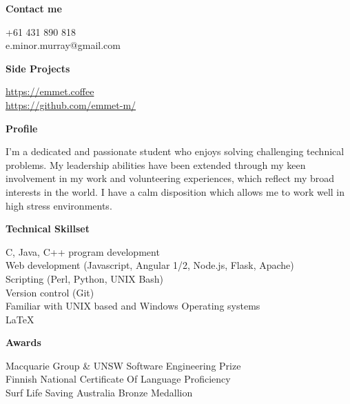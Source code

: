 \documentclass{article}
\newcommand{\mytitle}[1]{{\Large \textbf{#1}} \vspace{0.2cm}}
\begin{document}
\begin{minipage}[t]{0.3\linewidth}
    \vspace{0.2cm}
    {
        \mytitle{Contact me}
        
        +61 431 890 818 \\
        e.minor.murray@gmail.com \\

    }
    \vspace{0.2cm}
    {
        \mytitle{Side Projects}
        
        \href{https://emmet.coffee}{https://emmet.coffee} \\
        \href{https://github.com/emmet-m/}{https://github.com/emmet-m/} \\
        
    }
    \vspace{0.3cm}
    {
        \mytitle{Profile}
        
        I'm a dedicated and passionate student who enjoys solving challenging technical problems.
        My leadership abilities have been extended through my keen involvement in my work and volunteering experiences, which reflect my broad interests in the world.
        I have a calm disposition which allows me to work well in high stress environments. \\
    }
    \vspace{0.3cm}
    
    {
        \mytitle{Technical Skillset}

        C, Java, C++ program development \\ 

        Web development (Javascript, Angular 1/2, Node.js, Flask, Apache) \\

        Scripting (Perl, Python, UNIX Bash) \\

        Version control (Git) \\

        Familiar with UNIX based and Windows Operating systems \\

        {\large \LaTeX}
    }

    \vspace{0.5cm}

    {
        \mytitle{Awards}

        Macquarie Group \& UNSW Software Engineering Prize \\

        Finnish National Certificate Of Language Proficiency \\

        Surf Life Saving Australia Bronze Medallion
    }
%
%
\end{minipage}
%
\end{document}
